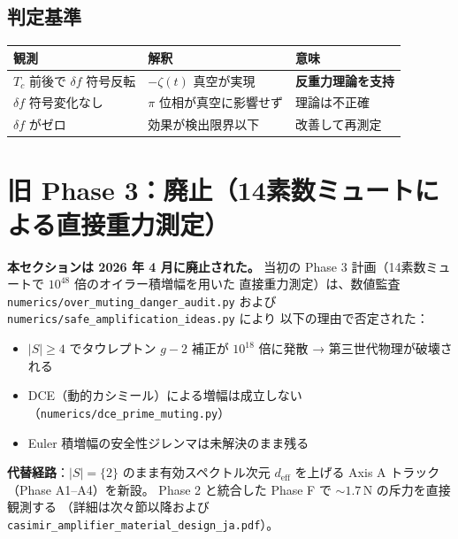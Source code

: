 \documentclass[11pt,a4paper]{article}
\begin{document}
\subsection{判定基準}

\begin{center}
\begin{tabular}{lll}
\toprule
観測 & 解釈 & 意味 \\
\midrule
$T_c$ 前後で $\delta f$ 符号反転 & $-\zeta(t)$ 真空が実現 & \textbf{反重力理論を支持} \\
$\delta f$ 符号変化なし & $\pi$ 位相が真空に影響せず & 理論は不正確 \\
$\delta f$ がゼロ & 効果が検出限界以下 & 改善して再測定 \\
\bottomrule
\end{tabular}
\end{center}


\section{旧 Phase 3：廃止（14素数ミュートによる直接重力測定）}

\begin{tcolorbox}[colback=red!5,colframe=red!60!black,title=★ 廃止通知 ★]
\textbf{本セクションは 2026 年 4 月に廃止された。}
当初の Phase 3 計画（14素数ミュートで $10^{48}$ 倍のオイラー積増幅を用いた
直接重力測定）は、数値監査
\texttt{numerics/over\_muting\_danger\_audit.py} および
\texttt{numerics/safe\_amplification\_ideas.py} により
以下の理由で否定された：
\begin{itemize}
\item $|S|\geq 4$ でタウレプトン $g-2$ 補正が $10^{18}$ 倍に発散
  → 第三世代物理が破壊される
\item DCE（動的カシミール）による増幅は成立しない
  （\texttt{numerics/dce\_prime\_muting.py}）
\item Euler 積増幅の安全性ジレンマは未解決のまま残る
\end{itemize}

\textbf{代替経路}：$|S|=\{2\}$ のまま有効スペクトル次元 $d_{\mathrm{eff}}$
を上げる Axis A トラック（Phase A1--A4）を新設。
Phase 2 と統合した Phase F で $\sim 1.7$\,N の斥力を直接観測する
（詳細は次々節以降および
\texttt{casimir\_amplifier\_material\_design\_ja.pdf}）。
\end{tcolorbox}
\end{document}
